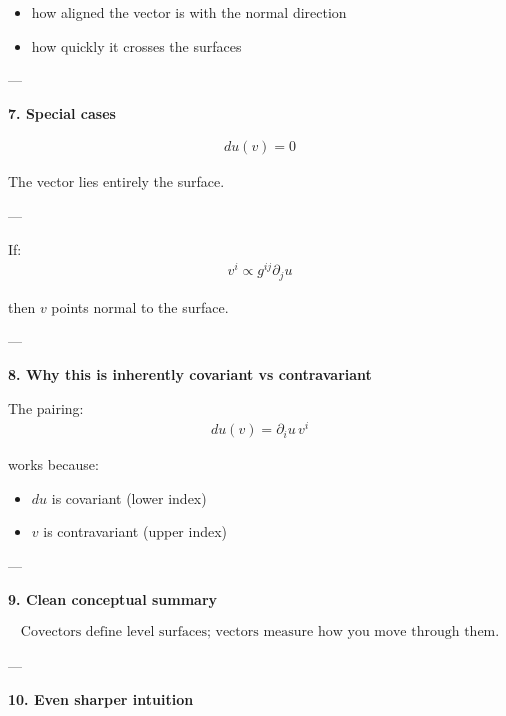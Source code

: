 \documentclass[12pt,a4paper]{report}
\begin{document}
\begin{description}
\begin{description}
\begin{itemize}
\item how aligned the vector is with the normal direction
\item how quickly it crosses the surfaces
\end{itemize}

---

\item \textbf{7. Special cases}

\item {}

\begin{align*}
du(v) = 0
\end{align*}

The vector lies entirely  the surface.

---

\item {}

If:
\begin{align*}
v^i \propto g^{ij}\partial_j u
\end{align*}

then $v$ points normal to the surface.

---

\item \textbf{8. Why this is inherently covariant vs contravariant}

The pairing:
\begin{align*}
du(v) = \partial_i u \, v^i
\end{align*}

works because:

\begin{itemize}
\item $du$ is covariant (lower index)
\item $v$ is contravariant (upper index)
\end{itemize}



---

\item \textbf{9. Clean conceptual summary}

\begin{align*}
\boxed{
\text{Covectors define level surfaces; vectors measure how you move through them.}
}
\end{align*}

---

\item \textbf{10. Even sharper intuition}


\end{description}
\end{description}
\end{document}

